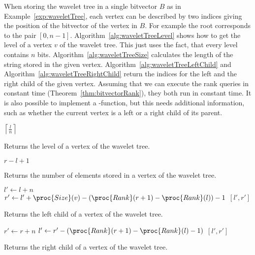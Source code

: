 When storing the wavelet tree in a single bitvector $B$ as in Example~\ref{exp:waveletTree}, each vertex can be described by two indices giving the position of the bitvector of the vertex in $B$. For example the root corresponds to the pair $[0,n-1]$. Algorithm~\ref{alg:waveletTreeLevel} shows how to get the level of a vertex $v$ of the wavelet tree. This just uses the fact, that every level contains $n$ bits. Algorithm~\ref{alg:waveletTreeSize} calculates the length of the string stored in the given vertex. Algorithm~\ref{alg:waveletTreeLeftChild} and Algorithm~\ref{alg:waveletTreeRightChild} return the indices for the left and the right child of the given vertex. Assuming that we can execute the rank queries in constant time (Theorem~\ref{thm:bitvectorRank}), they both run in constant time. It is also possible to implement a -function, but this needs additional information, such as whether the current vertex is a left or a right child of its parent.

\begin{algorithm}[htb]
  \begin{codebox}
    \li \Return $\left\lceil \frac{l}{n} \right\rceil$
  \end{codebox}
  \caption{Returns the level of a vertex of the wavelet tree.}
  \label{alg:waveletTreeLevel}
\end{algorithm}

\begin{algorithm}[htb]
  \begin{codebox}
    \li \Return $r - l + 1$
  \end{codebox}
  \caption{Returns the number of elements stored in a vertex of the wavelet tree.}
  \label{alg:waveletTreeSize}
\end{algorithm}

\begin{algorithm}[htb]
  \begin{codebox}
    \li $l' \gets l + n$
    \li $r' \gets l' + \proc{Size}(v) - (\proc{Rank}(r + 1) - \proc{Rank}(l)) - 1$
    \li \Return $[l',r']$
  \end{codebox}
  \caption{Returns the left child of a vertex of the wavelet tree.}
  \label{alg:waveletTreeLeftChild}
\end{algorithm}

\begin{algorithm}[htb]
  \begin{codebox}
    \li $r' \gets r + n$
    \li $l' \gets r' - (\proc{Rank}(r + 1) - \proc{Rank}(l) - 1)$
    \li \Return $[l',r']$
  \end{codebox}
  \caption{Returns the right child of a vertex of the wavelet tree.}
  \label{alg:waveletTreeRightChild}
\end{algorithm}


